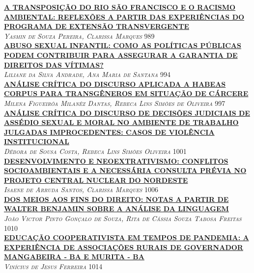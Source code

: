 \noindent \textsc{\hyperlink{trabalhos/249548.pdf.1}{\textbf{A TRANSPOSIÇÃO DO RIO SÃO FRANCISCO E O RACISMO AMBIENTAL: REFLEXÕES A PARTIR DAS EXPERIÊNCIAS DO PROGRAMA DE EXTENSÃO TRANSVERGENTE}}}\\ 
\noindent \textsc{\textit{Yasmin de Souza Pereira, Clarissa Marques}} \hfill 989\\ 

\noindent \textsc{\hyperlink{trabalhos/250342.pdf.1}{\textbf{ABUSO SEXUAL INFANTIL: COMO AS POLÍTICAS PÚBLICAS PODEM CONTRIBUIR PARA ASSEGURAR A GARANTIA DE DIREITOS DAS VÍTIMAS?}}}\\ 
\noindent \textsc{\textit{Liliane da Silva Andrade, Ana Maria de Santana}} \hfill 994\\ 

\noindent \textsc{\hyperlink{trabalhos/251517.pdf.1}{\textbf{ANÁLISE CRÍTICA DO DISCURSO APLICADA A HABEAS CORPUS PARA TRANSGÊNEROS EM SITUAÇÃO DE CÁRCERE }}}\\ 
\noindent \textsc{\textit{Milena Figueirôa Milanêz Dantas, Rebeca Lins Simões de Oliveira}} \hfill 997\\ 

\noindent \textsc{\hyperlink{trabalhos/251441.pdf.1}{\textbf{ANÁLISE CRÍTICA DO DISCURSO DE DECISÕES JUDICIAIS DE ASSÉDIO SEXUAL E MORAL NO AMBIENTE DE TRABALHO JULGADAS IMPROCEDENTES: CASOS DE VIOLÊNCIA INSTITUCIONAL}}}\\ 
\noindent \textsc{\textit{Débora de Sousa Costa, Rebeca Lins Simões Oliveira}} \hfill 1001\\ 

\noindent \textsc{\hyperlink{trabalhos/250059.pdf.1}{\textbf{DESENVOLVIMENTO E NEOEXTRATIVISMO: CONFLITOS SOCIOAMBIENTAIS E A NECESSÁRIA CONSULTA PRÉVIA NO PROJETO CENTRAL NUCLEAR DO NORDESTE}}}\\ 
\noindent \textsc{\textit{Isaene de Arruda Santos, Clarissa Marques}} \hfill 1006\\ 

\noindent \textsc{\hyperlink{trabalhos/249868.pdf.1}{\textbf{DOS MEIOS AOS FINS DO DIREITO: NOTAS A PARTIR DE  WALTER BENJAMIN SOBRE A ANÁLISE DA LINGUAGEM}}}\\ 
\noindent \textsc{\textit{João Victor Pinto Gonçalo de Souza, Rita de Cássia Souza Tabosa Freitas}} \hfill 1010\\ 

\noindent \textsc{\hyperlink{trabalhos/251866.pdf.1}{\textbf{EDUCAÇÃO COOPERATIVISTA EM TEMPOS DE PANDEMIA: A EXPERIÊNCIA DE ASSOCIAÇÕES RURAIS DE GOVERNADOR MANGABEIRA - BA E MURITA - BA}}}\\ 
\noindent \textsc{\textit{Vinícius de Jesus Ferreira}} \hfill 1014\\ 

